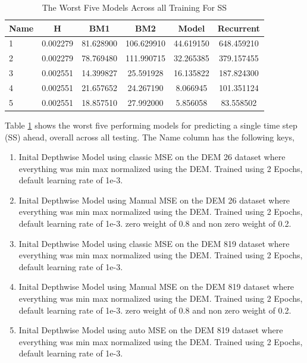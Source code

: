 \begin{table}[htbp]
	\centering
	\caption{The Worst Five Models Across all Training For SS}
	\label{tab:worstss}
	\begin{tabular}{p{2cm}ccccc}
		\toprule
		Name &  H &  BM1 &  BM2 &  Model &  Recurrent \\
		\midrule
		1 &       0.002279 &       81.628900 &      106.629910 &  44.619150 &          648.459210 \\
		2 &       0.002279 &       78.769480 &      111.990715 &  32.265385 &          379.157455 \\
		3 &       0.002551 &       14.399827 &       25.591928 &  16.135822 &          187.824300 \\
		4 &       0.002551 &       21.657652 &       24.267190 &   8.066945 &          101.351124 \\
		5 &       0.002551 &       18.857510 &       27.992000 &   5.856058 &           83.558502 \\
		\bottomrule
	\end{tabular}

\end{table}
Table \ref{tab:worstss} shows the worst five performing models for predicting a single time step (SS) ahead, overall across all testing. The Name column has the following keys,
\begin{enumerate}
	\item Inital Depthwise Model using classic MSE on the DEM 26 dataset where everything was min max normalized using the DEM. Trained using 2 Epochs, default learning rate of 1e-3.
	\item Inital Depthwise Model using Manual MSE on the DEM 26 dataset where everything was min max normalized using the DEM. Trained using 2 Epochs, default learning rate of 1e-3. zero weight of 0.8 and non zero weight of 0.2.
	\item Inital Depthwise Model using classic MSE on the DEM 819 dataset where everything was min max normalized using the DEM. Trained using 2 Epochs, default learning rate of 1e-3.
	\item Inital Depthwise Model using  Manual MSE on the DEM 819 dataset where everything was min max normalized using the DEM. Trained using 2 Epochs, default learning rate of 1e-3. zero weight of 0.8 and non zero weight of 0.2.
	\item Inital Depthwise Model using  auto MSE on the DEM 819 dataset where everything was min max normalized using the DEM. Trained using 2 Epochs, default learning rate of 1e-3.
\end{enumerate}


